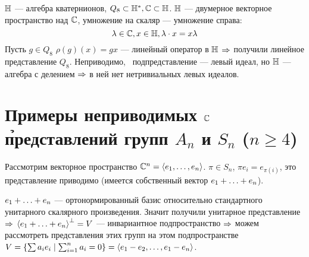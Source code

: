 $\mathbb{H}$ --- алгебра кватернионов,
$Q_8 \subset \mathbb{H}^*, \mathbb{C} \subset \mathbb{H}$.
$\mathbb{H}$ --- двумерное векторное пространство над $\mathbb{C}$,
умножение на скаляр --- умножение справа:
$$
	\lambda \in \mathbb{C}, x \in \mathbb{H}, \lambda \cdot x = x \lambda
$$
Пусть $g \in Q_8$ $\rho(g)(x) = g x$ --- линейный оператор в $\mathbb{H}$ $\Rightarrow$
получили линейное представление $Q_8$.
Неприводимо, \bt\ подпредставление --- левый идеал,
но $\mathbb{H}$ --- алгебра с делением $\Rightarrow$ в ней нет нетривиальных левых идеалов.


\section{Примеры неприводимых $\mathbb{C}$\h представлений групп $A_n$ и $S_n$ ($n \ge 4$)}
Рассмотрим векторное пространство $\mathbb{C}^n = \left\langle e_1 ,\ldots, e_n\right\rangle$.
$\pi \in S_n$, $\pi e_i = e_{\pi(i)}$, это представление приводимо
(имеется собственный вектор $e_1 \spl e_n$).

$e_1 \spl e_n$ --- ортонормированный базис относительно стандартного унитарного скалярного произведения.
Значит получили унитарное представление $\Rightarrow$
${\ha{e_1 \spl e_n}}^{\perp} = V$ --- инвариантное подпространство $\Rightarrow$
можем рассмотреть представления этих групп на этом подпространстве
$V = \left\{\sum a_i e_i \mid \sum_{i = 1}^{n} a_i = 0\right\} = \left\langle e_1 - e_2 ,\ldots, e_1 - e_n\right\rangle$.

